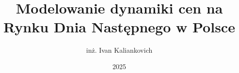 \documentclass[thesis=mgr,faculty=gik]{EE-dyplom}
\title{Modelowanie dynamiki cen na Rynku Dnia Następnego w Polsce}
\author{inż. Ivan Kaliankovich}
\date{2025}
\begin{document}
    \frontpages %

    
    \makeatletter
    \@openrightfalse
    \makeatother
    
    
    
    
    
    

    \bibliografia

    
    \acronymslist

    \listoffigures
    \listoftables
    \easyappendices
\end{document}
